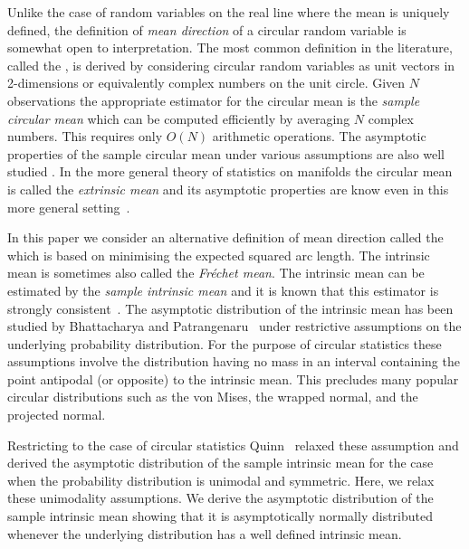 \documentclass[journal]{IEEEtran}
\begin{document}
Unlike the case of random variables on the real line where the mean is uniquely defined, the definition of \emph{mean direction} of a circular random variable is somewhat open to interpretation. The most common definition in the literature, called the , is derived by considering circular random variables as unit vectors in 2-dimensions or equivalently complex numbers on the unit circle. Given $N$ observations the appropriate estimator for the circular mean is the \emph{sample circular mean} which can be computed efficiently by averaging $N$ complex numbers. This requires only $O(N)$ arithmetic operations.  The asymptotic properties of the sample circular mean under various assumptions are also well studied \cite{Mardia_directional_statistics,Quinn2009_dasp_phase_only_information_loss,Jammalamadaka_dir_stat_book,McKilliam2010thesis}.  In the more general theory of statistics on manifolds the circular mean is called the \emph{extrinsic mean} and its asymptotic properties are know even in this more general setting~\cite{Bhattacharya_int_ext_means_2003}.

In this paper we consider an alternative definition of mean direction called the  which is based on minimising the expected squared arc length. %
The intrinsic mean is sometimes also called the \emph{Fr\'{e}chet mean}.  The intrinsic mean can be estimated by the \emph{sample intrinsic mean} and it is known that this estimator is strongly consistent~\cite{Ziezold_intrinsic_mean_1977,Bhattacharya_int_ext_means_2003}.  The asymptotic distribution of the intrinsic mean has been studied by Bhattacharya and  Patrangenaru~\cite{Bhattacharya_int_ext_means_2005} under restrictive assumptions on the underlying probability distribution.  For the purpose of circular statistics these assumptions involve the distribution having no mass in an interval containing the point antipodal (or opposite) to the intrinsic mean.  This precludes many popular circular distributions such as the von Mises, the wrapped normal, and the projected normal.

Restricting to the case of circular statistics Quinn~\cite{Quinn2007} relaxed these assumption and derived the asymptotic distribution of the sample intrinsic mean for the case when the probability distribution is unimodal and symmetric.  Here, we relax these unimodality assumptions.  We derive the asymptotic distribution of the sample intrinsic mean showing that it is asymptotically normally distributed whenever the underlying distribution has a well defined intrinsic mean.
\end{document}
